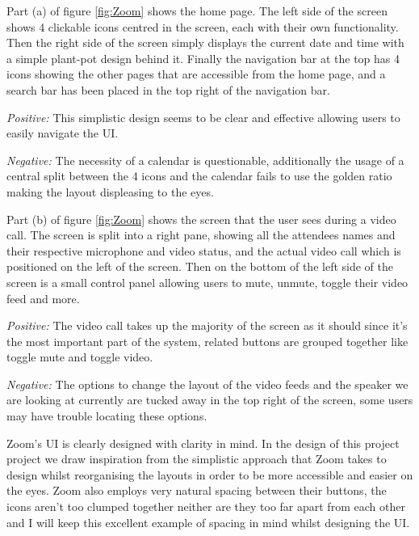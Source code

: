 Part (a) of figure \ref{fig:Zoom} shows the  
home page. The left side of the screen shows 4 
clickable icons centred in the screen, each with their own
functionality. Then the right side of the screen simply 
displays the current date and time with a simple plant-pot
design behind it. Finally the navigation bar at the top has 
4 icons showing the other pages that are accessible from the 
home page, and a search bar has been placed in the top right 
of the navigation bar.\\ \vspace{0.2cm}

\textit{Positive:} This simplistic design seems to be 
clear and effective allowing users to easily navigate the UI.
\\ \vspace{0.2cm}

\textit{Negative:} The necessity of a calendar is questionable,
additionally the usage of a central split between the 4 icons
and the calendar fails to use the golden ratio making the 
layout displeasing to the eyes.
\\ \vspace{0.2cm}

Part (b) of figure \ref{fig:Zoom} shows the screen that the 
user sees during a video call. The screen is split into a 
right pane, showing all the attendees names and their 
respective microphone and video status, and the actual video
call which is positioned on the left of the screen. Then on 
the bottom of the left side of the screen is a small control
panel allowing users to mute, unmute, toggle their video feed
and more. \\ \vspace{0.2cm}

\textit{Positive:} The video call takes up the majority of 
the screen as it should since it's the most important 
part of the system, related buttons are grouped together
like toggle mute and toggle video. \\ \vspace{0.2cm}

\textit{Negative:} The options to change the layout of the
video feeds and the speaker we are looking at currently are
tucked away in the top right of the screen, some users may 
have trouble locating these options. \\ \vspace{0.2cm}

Zoom's UI is clearly designed with clarity in mind. In the 
design of this project
project we draw inspiration from the simplistic approach 
that Zoom takes to design whilst reorganising the layouts in 
order to be more accessible and easier on the eyes. Zoom also 
employs very natural spacing between their buttons, the icons 
aren't too clumped together neither are they too far apart from
each other and I will keep this excellent example of spacing
in mind whilst designing the UI.

